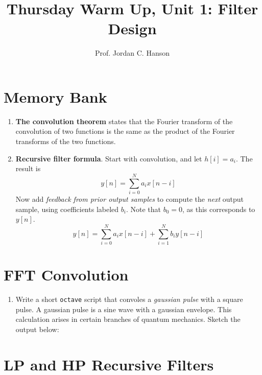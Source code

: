 \documentclass{article}
\begin{document}
\twocolumn

\title{Thursday Warm Up, Unit 1: Filter Design}
\author{Prof. Jordan C. Hanson}
\maketitle

\section{Memory Bank}

\begin{enumerate}
\item \textbf{The convolution theorem} states that the Fourier transform of the convolution of two functions is the same as the product of the Fourier transforms of the two functions.
\item \textbf{Recursive filter formula}.  Start with convolution, and let $h[i] = a_i$.  The result is
\begin{equation}
y[n] = \sum_{i=0}^N a_i x[n-i]
\end{equation}
Now add \textit{feedback from prior output samples} to compute the \textit{next} output sample, using coefficients labeled $b_i$.  Note that $b_0 = 0$, as this corresponds to $y[n]$.
\begin{equation}
y[n] = \sum_{i=0}^N a_i x[n-i] + \sum_{i=1}^N b_i y[n-i] \label{eq:1}
\end{equation}
\end{enumerate}

\section{FFT Convolution}

\begin{enumerate}
\item Write a short \verb+octave+ script that convoles a \textit{gaussian pulse} with a square pulse.  A gaussian pulse is a sine wave with a gaussian envelope.  This calculation arises in certain branches of quantum mechanics. Sketch the output below: \\ \vspace{4cm}
\end{enumerate}

\section{LP and HP Recursive Filters}
\end{document}
